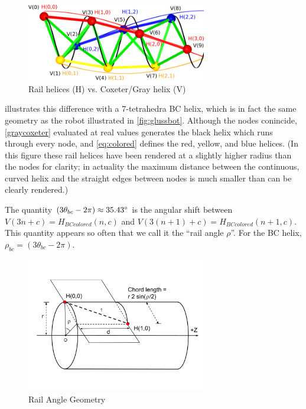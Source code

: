 \documentclass[review]{siamonline1116}
\begin{document}
\begin{figure}
  \centering
     \includegraphics[width=0.7\textwidth]{figures/Unified.png}
     \caption{Rail helices (H) vs. Coxeter/Gray helix (V) }
  \label{fig:helixcomparison}  
\end{figure}

 illustrates this difference with a 7-tetrahedra BC helix, which is
in fact the same geometry as the robot illustrated in \cref{fig:glussbot}.
Although the nodes conincide,
\cref{graycoxeter} evaluated
at real values generates the black helix which runs through every node, and \cref{eq:colored} defines
the red, yellow, and blue helices. (In this figure
these rail helices have been rendered at a slightly higher radius than the nodes for clarity;
in actuality the maximum distance between the continuous, curved helix and the
straight edges between nodes is much smaller than can be clearly rendered.)

The quantity $ (3 \theta_{bc} - 2 \pi) \approx 35.43 \degree $  is the angular shift between $V(3n + c)=H_{BCcolored}(n,c)$ and
$V(3(n+1)+c)=H_{BCcolored}(n+1,c)$.
This quantity appears so often that we call it the ``rail angle $\rho$''. For the BC helix, $\rho_{bc} = (3 \theta_{bc} - 2 \pi)$.

\begin{figure}[H]
     \centering
     \includegraphics[width=0.7\textwidth]{figures/RailAngleGeometry.png}
     \caption{Rail Angle Geometry}
  \label{railanglefig}
\end{figure}
\end{document}
